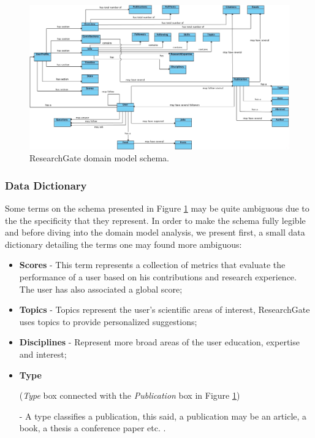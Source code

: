 \begin{figure}[h!]
  \hspace*{-1in}
  \includegraphics[width=1.20\textwidth]{img/researchgate-domain-model.jpg}
\caption{\label{img:rgatedomain} ResearchGate domain model schema.}
\end{figure}

\subsubsection*{Data Dictionary}
Some terms on the schema presented in Figure \ref{img:rgatedomain} may be quite ambiguous due to the the specificity that they represent. In order to make the schema fully legible and before diving into the domain model analysis, we present first, a small data dictionary detailing the terms one may found more ambiguous:

\begin{itemize}
\item \textbf{Scores} - This term represents a collection of metrics that evaluate the performance of a user based on his contributions and research experience. The user has also associated a global score;
\item \textbf{Topics} - Topics represent the user's scientific areas of interest, ResearchGate uses topics to provide personalized suggestions;
\item \textbf{Disciplines} - Represent more broad areas of the user education, expertise and interest;
\item \textbf{Type} \begin{small}(\textit{Type} box connected with the \textit{Publication} box in Figure \ref{img:rgatedomain})\end{small} - A type classifies a publication, this said, a publication may be an article, a book, a thesis a conference paper etc. .
\end{itemize}

